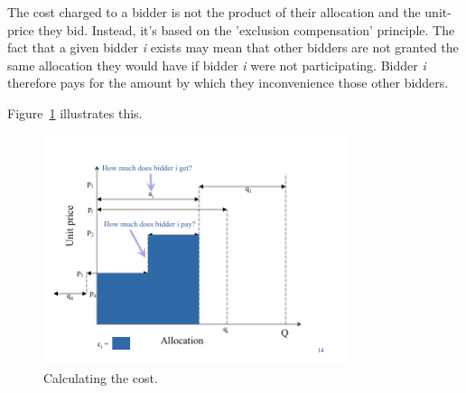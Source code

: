 The cost charged to a bidder is not the product of their allocation and the unit-price they bid. Instead, it's based on the 'exclusion compensation' principle. The fact that a given bidder {\it i} exists may mean that other bidders are not granted the same allocation they would have if bidder {\it i} were not participating. Bidder {\it i} therefore pays for the amount by which they inconvenience those other bidders.

Figure~\ref{fig:cost} illustrates this.

\begin{figure}[h]
 \centering
   \includegraphics[width=0.8\textwidth]{cost}
       \caption{Calculating the cost.}
 \label{fig:cost}
\end{figure}
